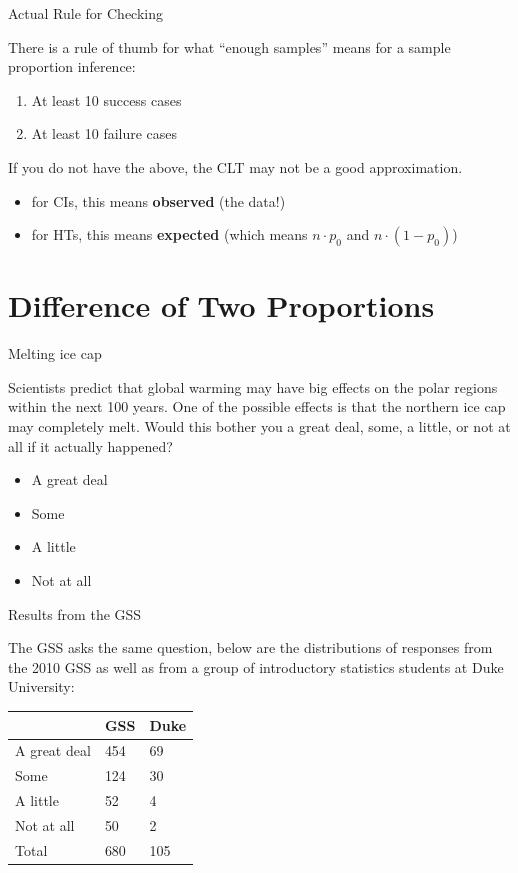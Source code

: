 \documentclass[
  ignorenonframetext,
]{beamer}
\providecommand{\tightlist}{%
  \setlength{\itemsep}{0pt}\setlength{\parskip}{0pt}}
\begin{document}
\begin{frame}{Actual Rule for Checking}
\protect\hypertarget{actual-rule-for-checking}{}

There is a rule of thumb for what ``enough samples'' means for a sample
proportion inference:

\begin{enumerate}
\tightlist
\item
  At least 10 success cases
\item
  At least 10 failure cases
\end{enumerate}

If you do not have the above, the CLT may not be a good approximation.

\begin{itemize}
\tightlist
\item
  for CIs, this means \textbf{observed} (the data!)
\item
  for HTs, this means \textbf{expected} (which means \(n\cdot p_0\) and
  \(n\cdot(1-p_0)\))
\end{itemize}

\end{frame}

\hypertarget{difference-of-two-proportions}{%
\section{Difference of Two
Proportions}\label{difference-of-two-proportions}}

\begin{frame}{Melting ice cap}
\protect\hypertarget{melting-ice-cap}{}

Scientists predict that global warming may have big effects on the polar
regions within the next 100 years. One of the possible effects is that
the northern ice cap may completely melt. Would this bother you a great
deal, some, a little, or not at all if it actually happened?

\begin{itemize}
\tightlist
\item
  A great deal
\item
  Some
\item
  A little
\item
  Not at all
\end{itemize}

\end{frame}

\begin{frame}{Results from the GSS}
\protect\hypertarget{results-from-the-gss}{}

The GSS asks the same question, below are the distributions of responses
from the 2010 GSS as well as from a group of introductory statistics
students at Duke University:

\begin{longtable}[]{@{}lll@{}}
\toprule
\(\;\) & GSS & Duke\tabularnewline
\midrule
\endhead
A great deal & 454 & 69\tabularnewline
Some & 124 & 30\tabularnewline
A little & 52 & 4\tabularnewline
Not at all & 50 & 2\tabularnewline
Total & 680 & 105\tabularnewline
\bottomrule
\end{longtable}

\end{frame}
\end{document}
